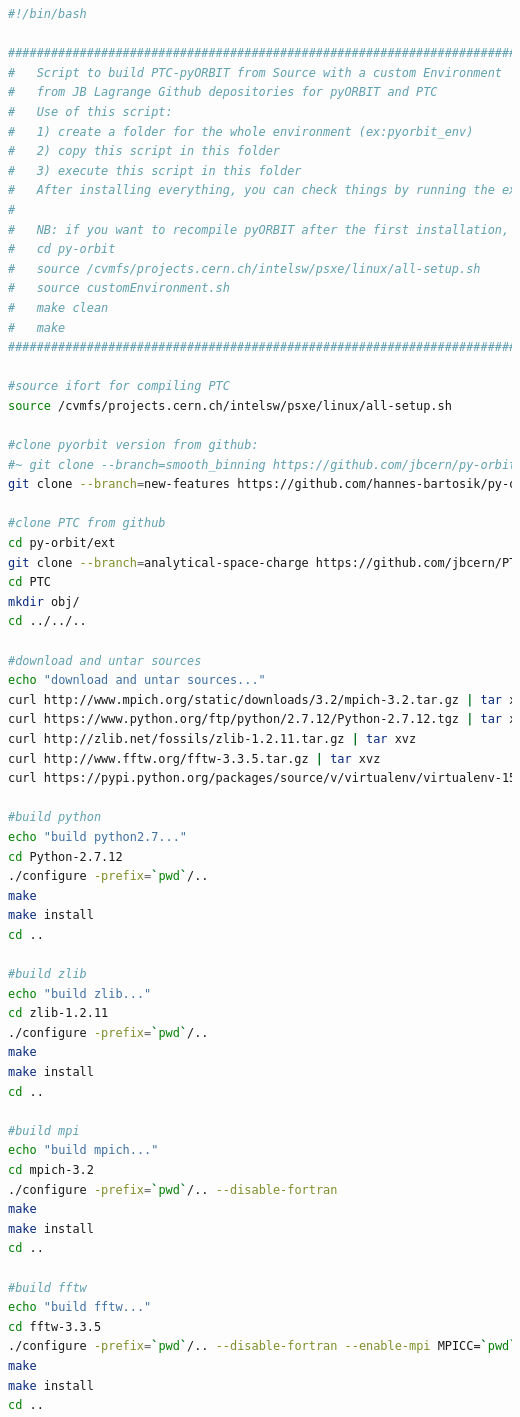 \documentclass[a4paper]{cernatsnote}
\begin{document}
\begin{lstlisting}[language=bash, belowskip=-3\medskipamount]
#!/bin/bash

#######################################################################
#   Script to build PTC-pyORBIT from Source with a custom Environment
#   from JB Lagrange Github depositories for pyORBIT and PTC
#   Use of this script:
#   1) create a folder for the whole environment (ex:pyorbit_env)
#   2) copy this script in this folder
#   3) execute this script in this folder
#   After installing everything, you can check things by running the examples in py-orbit/examples/
#
#   NB: if you want to recompile pyORBIT after the first installation, you need to use:
#	cd py-orbit
#	source /cvmfs/projects.cern.ch/intelsw/psxe/linux/all-setup.sh
#	source customEnvironment.sh
#	make clean
#	make
#######################################################################

#source ifort for compiling PTC
source /cvmfs/projects.cern.ch/intelsw/psxe/linux/all-setup.sh

#clone pyorbit version from github:
#~ git clone --branch=smooth_binning https://github.com/jbcern/py-orbit.git
git clone --branch=new-features https://github.com/hannes-bartosik/py-orbit.git

#clone PTC from github
cd py-orbit/ext
git clone --branch=analytical-space-charge https://github.com/jbcern/PTC.git
cd PTC
mkdir obj/
cd ../../..

#download and untar sources
echo "download and untar sources..."
curl http://www.mpich.org/static/downloads/3.2/mpich-3.2.tar.gz | tar xvz
curl https://www.python.org/ftp/python/2.7.12/Python-2.7.12.tgz | tar xvz
curl http://zlib.net/fossils/zlib-1.2.11.tar.gz | tar xvz
curl http://www.fftw.org/fftw-3.3.5.tar.gz | tar xvz
curl https://pypi.python.org/packages/source/v/virtualenv/virtualenv-15.0.0.tar.gz  | tar xvz

#build python
echo "build python2.7..."
cd Python-2.7.12
./configure -prefix=`pwd`/..
make
make install
cd ..

#build zlib
echo "build zlib..."
cd zlib-1.2.11
./configure -prefix=`pwd`/..
make
make install
cd ..

#build mpi
echo "build mpich..."
cd mpich-3.2
./configure -prefix=`pwd`/.. --disable-fortran
make
make install
cd ..

#build fftw
echo "build fftw..."
cd fftw-3.3.5
./configure -prefix=`pwd`/.. --disable-fortran --enable-mpi MPICC=`pwd`/../bin/mpicc
make
make install
cd ..


\end{lstlisting}
\end{document}
